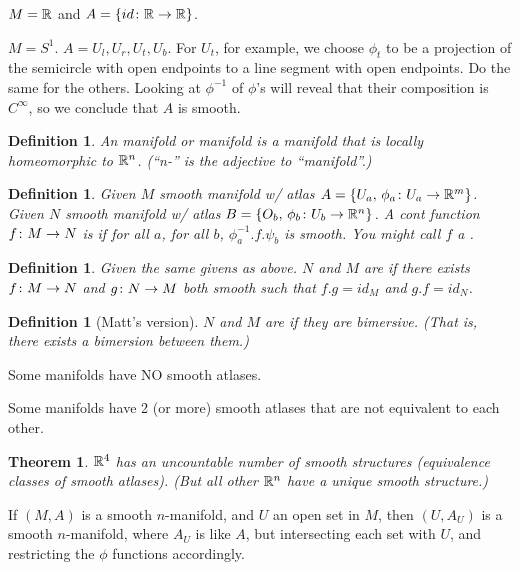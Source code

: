 \documentclass[11pt]{amsbook}
\theoremstyle{mystyle} %
\newtheorem{thrm}[thm]{Theorem}
\newtheorem{defi}[thm]{Definition}
\numberwithin{thm}{section}
\begin{document}
\begin{example}
	$M = {\mathbb R}$ and $A = \{ id\colon {\mathbb R} \to {\mathbb R} \}$.
\end{example}

\begin{example}
	$M = S^1$.  $A = {U_l, U_r, U_t, U_b}$.  For $U_t$, for example, we choose $\phi_t$ to be a projection of the semicircle with open endpoints to a line segment with open endpoints.  Do the same for the others.  Looking at $\phi^{-1}$ of $\phi$'s will reveal that their composition is $C^\infty$, so we conclude that $A$ is smooth.
\end{example}

\begin{defi}
	An manifold or  manifold is a manifold that is locally homeomorphic to ${\mathbb R}^n$.  (``n-'' is the adjective to ``manifold''.)
\end{defi}


\begin{defi}
	Given $M$ smooth manifold w/ atlas $A = \{ U_a, \,  \phi_a \colon U_a \to {\mathbb R}^m \}$.
	Given $N$ smooth manifold w/ atlas $B = \{ O_b, \,  \phi_b \colon U_b \to {\mathbb R}^n \}$.
	A cont function $f \colon M \to N$ is  if for all $a$, for all $b$, $\phi_a^{-1}.f.\psi_b$ is smooth.  You might call $f$ a .
\end{defi}
\begin{defi}
	Given the same givens as above.
	$N$ and $M$ are  if there exists $f \colon M \to N$ and $g \colon N \to M$ both smooth such that $f.g = id_M$ and $g.f = id_N$.
\end{defi}
\begin{defi}[Matt's version]
	$N$ and $M$ are  if they are bimersive.  (That is, there exists a bimersion between them.)
\end{defi}

\begin{rmk}
	Some manifolds have NO smooth atlases.

	Some manifolds have 2 (or more) smooth atlases that are not equivalent to each other.
\end{rmk}


\begin{thrm}
	${\mathbb R}^4$ has an uncountable number of smooth structures (equivalence classes of smooth atlases).  (But all other ${\mathbb R}^n$ have a unique smooth structure.)
\end{thrm}

\begin{rmk}
	If $(M,A)$ is a smooth $n$-manifold, and $U$ an open set in $M$, then $(U,A_U)$ is a smooth $n$-manifold, where $A_U$ is like $A$, but intersecting each set with $U$, and restricting the $\phi$ functions accordingly.
\end{rmk}
\end{document}
